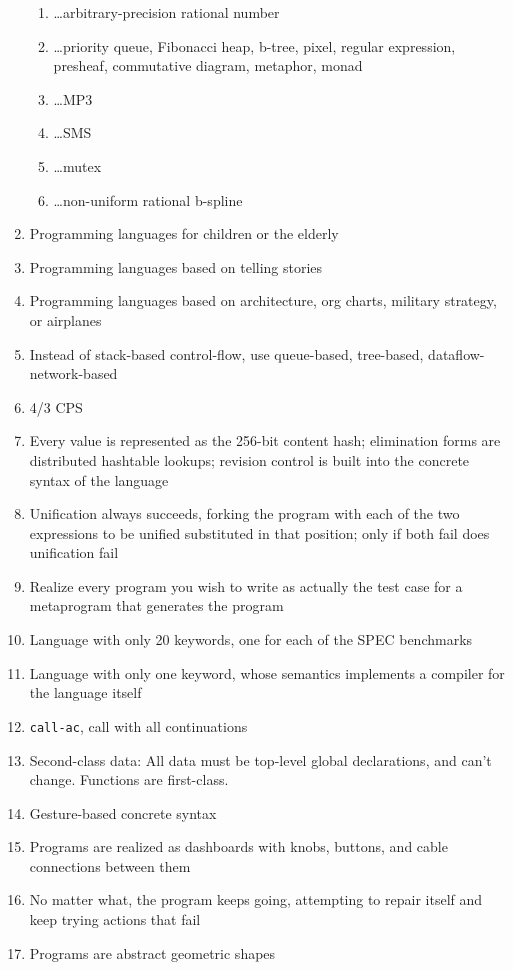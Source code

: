 \documentclass[acmtocl]%
{boviktrans}
\begin{document}
\begin{enumerate}
\begin{enumerate}
     \item \ldots arbitrary-precision rational number
     \item \ldots priority queue, Fibonacci heap, b-tree, pixel, regular expression, presheaf, commutative diagram, metaphor, monad
     \item \ldots MP3
     \item \ldots SMS
     \item \ldots mutex
     \item \ldots non-uniform rational b-spline
   \end{enumerate}
\item Programming languages for children or the elderly
\item Programming languages based on telling stories
\item Programming languages based on architecture, org charts, military strategy, or airplanes
\item Instead of stack-based control-flow, use queue-based, tree-based, dataflow-network-based
\item 4/3 CPS
\item Every value is represented as the 256-bit content hash; elimination forms are distributed hashtable lookups; revision control is built into the concrete syntax of the language
\item Unification always succeeds, forking the program with each of the two expressions to be unified substituted in that position; only if both fail does unification fail
\item Realize every program you wish to write as actually the test case for a metaprogram that generates the program
\item Language with only 20 keywords, one for each of the SPEC benchmarks
\item Language with only one keyword, whose semantics implements a compiler for the language itself
\item {\tt call-ac}, call with all continuations
\item Second-class data: All data must be top-level global declarations, and can't change. Functions are first-class.
\item Gesture-based concrete syntax
\item Programs are realized as dashboards with knobs, buttons, and cable connections between them
\item No matter what, the program keeps going, attempting to repair itself and keep trying actions that fail
\item Programs are abstract geometric shapes

\end{enumerate}
\end{document}
